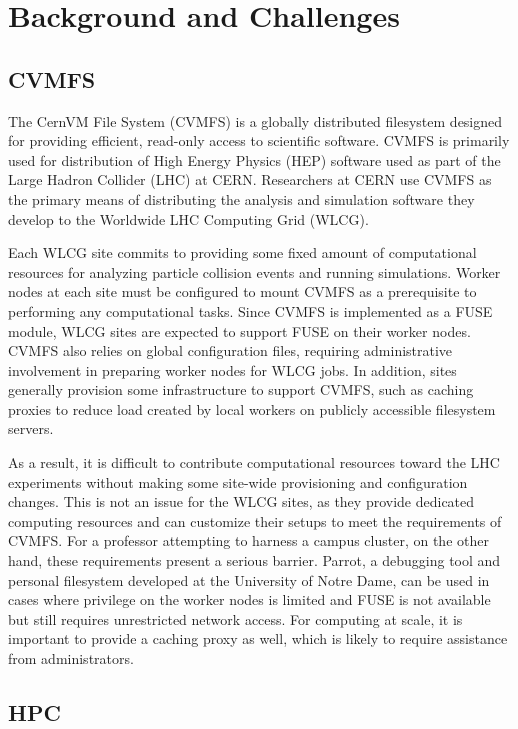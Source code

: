 \documentclass[sigconf]{acmart}
\begin{document}
\section{Background and Challenges}

\subsection{CVMFS}
The CernVM File System (CVMFS) is a globally distributed filesystem designed for providing efficient,
read-only access to scientific software.
CVMFS is primarily used for distribution of High Energy Physics (HEP) software used as part of the Large Hadron Collider (LHC) at CERN.
Researchers at CERN use CVMFS as the primary means of distributing the analysis and simulation software they develop to the Worldwide LHC Computing Grid (WLCG).

Each WLCG site commits to providing some fixed amount of computational resources for analyzing particle collision events and running simulations.
Worker nodes at each site must be configured to mount CVMFS as a prerequisite to performing any computational tasks.
Since CVMFS is implemented as a FUSE module,
WLCG sites are expected to support FUSE on their worker nodes.
CVMFS also relies on global configuration files,
requiring administrative involvement in preparing worker nodes for WLCG jobs.
In addition, sites generally provision some infrastructure to support CVMFS,
such as caching proxies to reduce load created by local workers on publicly accessible filesystem servers.

As a result, it is difficult to contribute computational resources toward the LHC experiments without making some site-wide provisioning and configuration changes.
This is not an issue for the WLCG sites,
as they provide dedicated computing resources and can customize their setups to meet the requirements of CVMFS.
For a professor attempting to harness a campus cluster,
on the other hand, these requirements present a serious barrier.
Parrot, a debugging tool and personal filesystem developed at the University of Notre Dame,
can be used in cases where privilege on the worker nodes is limited and FUSE is not available but still requires unrestricted network access.
For computing at scale, it is important to provide a caching proxy as well,
which is likely to require assistance from administrators.

\subsection{HPC}
\end{document}
